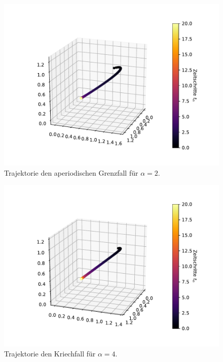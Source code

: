 \begin{figure}[H]
  \centering
  \includegraphics[scale=0.7]{A2/plots/aufg2_a2.pdf}
  \caption{Trajektorie den aperiodischen Grenzfall für $\alpha = 2$.}
  \label{fig:Aperiodisch}
\end{figure}

\begin{figure}[H]
  \centering
  \includegraphics[scale=0.7]{A2/plots/aufg2_a3.pdf}
  \caption{Trajektorie den Kriechfall für $\alpha = 4$.}
  \label{fig:Kriech}
\end{figure}

